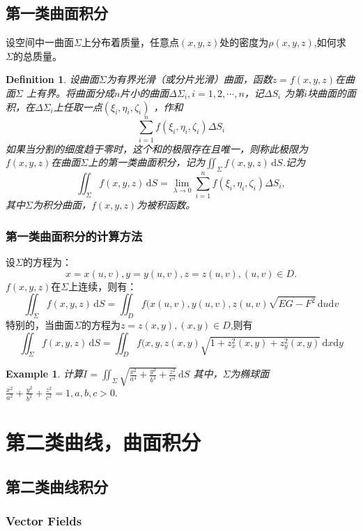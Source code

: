 \documentclass[a4paper,12pt]{article}
\newtheorem{example}{Example}             %
\newtheorem{definition}{Definition}
\begin{document}
\begin{CJK}{UTF8}{gbsn}
\subsection{第一类曲面积分}
设空间中一曲面$\Sigma$上分布着质量，任意点$(x,y,z)$处的密度为$\rho(x,y,z)$,如何求
$\Sigma$的总质量。

\begin{definition}
    设曲面$\Sigma$为有界光滑（或分片光滑）曲面，函数$z = f(x,y,z)$在曲面$\Sigma$
    上有界。将曲面分成$n$片小的曲面$\Delta\Sigma_i,i=1,2,\cdots,n$，记$\Delta S_i$
    为第$i$块曲面的面积，在$\Delta\Sigma_i$上任取一点$(\xi_i,\eta_i,\zeta_i)$
    ，作和
    \[
        \sum_{i=1}^{n}f(\xi_i,\eta_i,\zeta_i)\Delta S_i
    \]
    如果当分割的细度趋于零时，这个和的极限存在且唯一，则称此极限为
    $f(x,y,z)$在曲面$\Sigma$上的第一类曲面积分，记为$\displaystyle \iint_{\Sigma} 
    f(x,y,z)\,\mathrm{d}S$.记为
    \[
        \iint_{\Sigma}f(x,y,z)\, \mathrm{d}S = \lim_{\lambda \to 0}
        \sum_{i=1}^{n}f(\xi_i,\eta_i,\zeta_i)\Delta S_i,
    \]
其中$\Sigma$为积分曲面，$f(x,y,z)$为被积函数。
\end{definition}
\subsubsection{第一类曲面积分的计算方法}
设$\Sigma$的方程为：
\[
    x = x(u,v), y = y(u,v), z = z(u,v), (u,v) \in D.
\]
$f(x,y,z)$在$\Sigma$上连续，则有：
\[
    \iint_{\Sigma}f(x,y,z)\, \mathrm{d}S = \iint_D f(x(u,v), y(u,v), z(u,v)
    \sqrt{EG-F^2}\, \mathrm{d}u \mathrm{d}v
\]
特别的，当曲面$\Sigma$的方程为$z = z(x,y), (x,y) \in D$,则有
\[
    \iint_{\Sigma}f(x,y,z)\, \mathrm{d}S = \iint_D f(x, y, z(x,y)
    \sqrt{1+z_x^2(x,y)+z_y^2(x,y)}\, \mathrm{d}x \mathrm{d}y
\]
\begin{example}
    计算$\displaystyle I = \iint_{\Sigma}\sqrt{\frac{x^2}{a^4} + \frac{y^2}{b^4} + \frac{z^2}{c^4}}\, \mathrm{d}S$
    其中，$\Sigma$为椭球面$\displaystyle \frac{x^2}{a^2} + \frac{y^2}{b^2} + \frac{z^2}{c^2} = 1, a,b,c>0.$
\end{example}


\section{第二类曲线，曲面积分}
\subsection{第二类曲线积分}
\subsubsection{Vector Fields}


\end{CJK}
\end{document}
